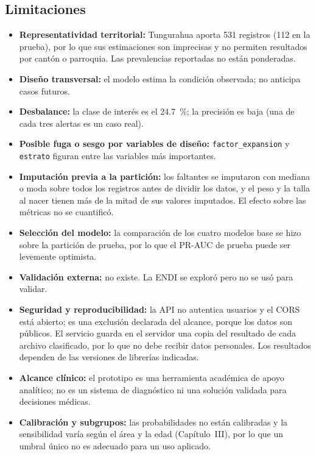 \subsection{Limitaciones}
\begin{itemize}
  \item \textbf{Representatividad territorial:} Tungurahua aporta \num{531} registros (112 en la prueba), por lo que sus estimaciones son imprecisas y no permiten resultados por cantón o parroquia. Las prevalencias reportadas no están ponderadas.
  \item \textbf{Diseño transversal:} el modelo estima la condición observada; no anticipa casos futuros.
  \item \textbf{Desbalance:} la clase de interés es el \SI{24.7}{\percent}; la precisión es baja (una de cada tres alertas es un caso real).
  \item \textbf{Posible fuga o sesgo por variables de diseño:} \texttt{factor\_expansion} y \texttt{estrato} figuran entre las variables más importantes.
  \item \textbf{Imputación previa a la partición:} los faltantes se imputaron con mediana o moda sobre todos los registros antes de dividir los datos, y el peso y la talla al nacer tienen más de la mitad de sus valores imputados. El efecto sobre las métricas no se cuantificó.
  \item \textbf{Selección del modelo:} la comparación de los cuatro modelos base se hizo sobre la partición de prueba, por lo que el PR-AUC de prueba puede ser levemente optimista.
  \item \textbf{Validación externa:} no existe. La ENDI se exploró pero no se usó para validar.
  \item \textbf{Seguridad y reproducibilidad:} la API no autentica usuarios y el CORS está abierto; es una exclusión declarada del alcance, porque los datos son públicos. El servicio guarda en el servidor una copia del resultado de cada archivo clasificado, por lo que no debe recibir datos personales. Los resultados dependen de las versiones de librerías indicadas.
  \item \textbf{Alcance clínico:} el prototipo es una herramienta académica de apoyo analítico; no es un sistema de diagnóstico ni una solución validada para decisiones médicas.
  \item \textbf{Calibración y subgrupos:} las probabilidades no están calibradas y la sensibilidad varía según el área y la edad (Capítulo~III), por lo que un umbral único no es adecuado para un uso aplicado.
\end{itemize}

